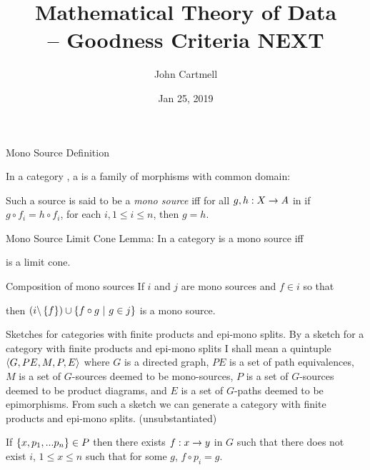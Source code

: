 \documentclass[xcolor=pst,dvips]{beamer}
\title[John Cartmell]{Mathematical Theory of Data \\ -- Goodness Criteria NEXT}
\author{John Cartmell}
\institute{ad otium}
\date{Jan 25, 2019}
\begin{document}
\begin{frame}{Mono Source Definition} %
\begin{definition}
In a category , a   is a family of morphisms with common domain: \\
\begin{center}
\scalebox{0.65}{

} 
\end{center}
\medskip
Such a source is said to be a \textit{mono source} iff for all $g,h:X \rightarrow A$ in  if $g \circ f_i = h \circ f_i$, for each $i, 1 \leq i \leq n$, then $g=h$.
\end{definition}
\end{frame}

\begin{frame}{Mono Source Limit Cone}  %
Lemma: In a category 
\scalebox{0.65}{

} is a mono source iff \\
\begin{center}
\scalebox{0.65}{

} 
is a limit cone.
\end{center}
\end{frame}


\begin{frame}{Composition of mono sources}
If $i$ and $j$ are mono sources and $f \in i$ so that
\begin{center}
\scalebox{0.65}{

}
\end{center}
then $(i \backslash \left\{f\right\}) \cup \left\{f \circ g \ \middle|\ g \in j\right\}$ is a mono source.
\end{frame}

\begin{frame}{Sketches for categories with finite products and epi-mono splits.}
By a sketch for a category with finite products and epi-mono splits I shall mean a quintuple
$\langle G,PE,M,P,E\rangle$
 where $G$ is a directed graph, 
$PE$ is a set of path equivalences, 
$M$ is a set of $G$-sources deemed to be mono-sources,
$P$ is a set of $G$-sources deemed to be product diagrams, 
and $E$ is a set of $G$-paths deemed to be epimorphisms.
\medskip
From such a sketch we can generate a category with finite products and epi-mono splits.  (unsubstantiated)   
\end{frame}

\begin{frame}
\scmonosketchwording 

 If $\left\{x,p_1,...p_n\right\}\in P$ then there exists $f: x \rightarrow y$ in $G$ such that there does not exist $i$, $1 \leq x \leq n$
such that for some $g$, $f \circ p_i = g$. 

\end{frame}
\end{document}
